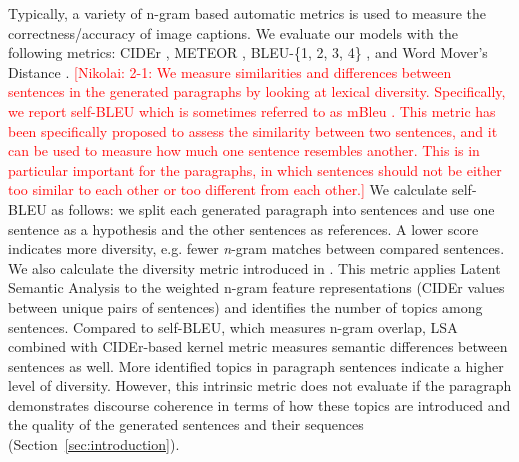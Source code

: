 \documentclass[11pt,a4paper]{article}
\newcommand{\kibitz}[2]{\ifnum\Comments=1\textcolor{#1}{#2}\fi}
\newcommand{\nikolai}[1]{\kibitz{red}  {[Nikolai: #1]}}
\begin{document}
Typically, a variety of n-gram based automatic metrics is used to measure the correctness/accuracy of image captions.
We evaluate our models %
with the following metrics: CIDEr \cite{vedantam2014cider}, METEOR \cite{meteor14}, BLEU-\{1, 2, 3, 4\} \cite{bleu}, and Word Mover's Distance \cite{Kusner2015FromWE,kilickaya2017}.
\nikolai{2-1: We measure similarities and differences between sentences in the generated paragraphs by looking at lexical diversity.
Specifically, we report self-BLEU \cite{Zhu2018selfbleu} which is sometimes referred to as mBleu \cite{Shetty2017}. %
This metric has been specifically proposed to assess the similarity between two sentences, and it can be used to measure how much one sentence resembles another.
This is in particular important for the paragraphs, in which sentences should not be either too similar to each other or too different from each other.}
We calculate self-BLEU as follows: we split each generated paragraph into sentences and use one sentence as a hypothesis and the other sentences as references.
A lower score indicates more diversity, e.g. fewer \textit{n}-gram matches between compared sentences.
We also calculate the diversity metric introduced in \cite{wang2019describing}.
This metric applies Latent Semantic Analysis \cite{deerwester90indexing} to the weighted n-gram feature representations (CIDEr values between unique pairs of sentences) and identifies the number of topics among sentences.
Compared to self-BLEU, which measures n-gram overlap, LSA combined with CIDEr-based kernel metric measures semantic differences between sentences as well.
More identified topics in paragraph sentences indicate a higher level of diversity.
However, this intrinsic metric does not evaluate if the paragraph demonstrates discourse coherence in terms of how these topics are introduced and the quality of the generated sentences and their sequences (Section~\ref{sec:introduction}). %
\end{document}

